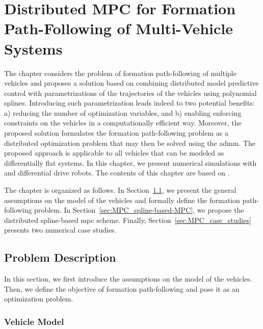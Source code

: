 \chapter{Distributed MPC for Formation Path-Following of Multi-Vehicle Systems}
\label{chap:handpos_MPC}


The chapter considers the problem of formation path-following of multiple vehicles and proposes a solution based on combining distributed model predictive control with parametrizations of the trajectories of the vehicles using polynomial splines. Introducing such parametrization leads indeed to two potential benefits: a) reducing the number of optimization variables, and b) enabling enforcing constraints on the vehicles in a computationally efficient way. Moreover, the proposed solution formulates the formation path-following problem as a distributed optimization problem that may then be solved using the \gls{admm}.
The proposed approach is applicable to all vehicles that can be modeled as differentially flat systems.
In this chapter, we present numerical simulations with  and differential drive robots.
The contents of this chapter are based on \cite{matous_MPC_2022}.

The chapter is organized as follows.
In Section~\ref{sec:MPC_problem-description}, we present the general assumptions on the model of the vehicles and formally define the formation path-following problem.
In Section~\ref{sec:MPC_spline-based-MPC}, we propose the distributed spline-based \gls{mpc} scheme.
Finally, Section~\ref{sec:MPC_case_studies} presents two numerical case studies.

\section{Problem Description}
\label{sec:MPC_problem-description}

In this section, we first introduce the assumptions on the model of the vehicles.
Then, we define the objective of formation path-following and pose it as an optimization problem.



\subsection{Vehicle Model}
\label{ssec:MPC_vehicle-model}



